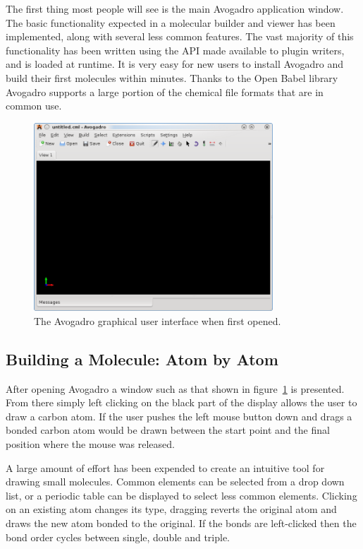 \documentclass{article}
\begin{document}
The first thing most people will see is the main Avogadro application window.
The basic functionality expected in a molecular builder and viewer has been
implemented, along with several less common features. The vast majority of this
functionality has been written using the API made available to plugin writers,
and is loaded at runtime. It is very easy for new users to install Avogadro and
build their first molecules within minutes. Thanks to the Open Babel library
Avogadro supports a large portion of the chemical file formats that are in
common use.
\begin{figure}
  \begin{center}
    \includegraphics[width=0.8\textwidth]{images/avogadro-0-9-8}
  \end{center}
  \caption{The Avogadro graphical user interface when first opened.}
  \label{f:avogadrogui}
\end{figure}


\subsection{Building a Molecule: Atom by Atom}

After opening Avogadro a window such as that shown in figure~\ref{f:avogadrogui} is presented. From there simply left clicking on the black part of the display allows the user to draw a carbon atom. If the user pushes the left mouse button down and drags a bonded carbon atom would be drawn between the start point and the final position where the mouse was released.

A large amount of effort has been expended to create an intuitive tool for drawing small molecules. Common elements can be selected from a drop down list, or a periodic table can be displayed to select less common elements. Clicking on an existing atom changes its type, dragging reverts the original atom and draws the new atom bonded to the original. If the bonds are left-clicked then the bond order cycles between single, double and triple.
\end{document}
